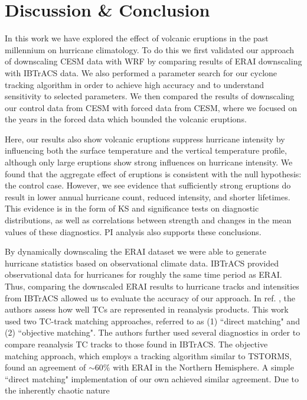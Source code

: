 \documentclass[smallextended]{svjour3}       %
\begin{document}
\section{Discussion \& Conclusion}
\label{discuss}
In this work we have explored the effect of volcanic eruptions in 
the past millennium on hurricane climatology. To do this we first 
validated our approach of downscaling CESM data with WRF by comparing 
results of ERAI downscaling with IBTrACS data. We also performed a 
parameter search for our cyclone tracking algorithm in order to achieve 
high accuracy and to understand sensitivity to selected parameters. 
We then compared the results of downscaling our control data from CESM 
with forced data from CESM, where we focused on the years in the forced 
data which bounded the volcanic eruptions. 
\par
Here, our results also show volcanic eruptions suppress hurricane intensity by
influencing both the surface temperature and the vertical temperature
profile, although only large eruptions show strong influences on
hurricane intensity. We found that the aggregate effect of eruptions is 
consistent with the null hypothesis: the control case. However, we see evidence 
that sufficiently strong eruptions do result in lower annual hurricane count, 
reduced intensity, and shorter lifetimes. This evidence is in the form of 
KS and significance tests on diagnostic distributions, as well as 
correlations between strength and changes in the mean values of these diagnostics. PI analysis also supports these conclusions. 
\par
By dynamically downscaling the ERAI dataset we were able to generate 
hurricane statistics based on observational climate data. 
IBTrACS provided observational data for hurricanes for roughly the 
same time period as ERAI. Thus, comparing
the downscaled ERAI results to hurricane tracks and intensities from
IBTrACS allowed us to evaluate the accuracy of our approach. 
In ref. \cite{hodges2017well}, the authors assess how well TCs are
represented in reanalysis products. This work used two TC-track
matching approaches, referred to as (1) ``direct matching" and (2)
``objective matching". The authors further used several diagnostics in
order to compare reanalysis TC tracks to those found in IBTrACS. The
objective matching approach, which employs a tracking algorithm
similar to TSTORMS, found an agreement of ${\sim}60\%$ with ERAI in
the Northern Hemisphere. A simple ``direct matching" implementation of
our own achieved similar agreement. Due to the inherently chaotic nature 
\end{document}
